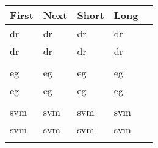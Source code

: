 \documentclass[a4paper]{article}
\newcommand*{\samplerow}[1]{%
  \gls{#1} & \gls{#1} & \acrshort{#1} & \acrlong{#1}\\
 \glsreset{#1}\Gls{#1} & \Gls{#1} & \Acrshort{#1} & \Acrlong{#1}\\
 \glsreset{#1}\GLS{#1} & \GLS{#1} & \ACRshort{#1} & \ACRlong{#1}\\
}
\begin{document}
\begin{center}
\begin{tabular}{lllll}
\toprule
\bfseries First & \bfseries Next & \bfseries Short & \bfseries Long
\\\midrule
\samplerow{dr}
\midrule
\samplerow{eg}
\midrule
\samplerow{svm}
\bottomrule
\end{tabular}
\end{center}

\printglossaries
\end{document}
